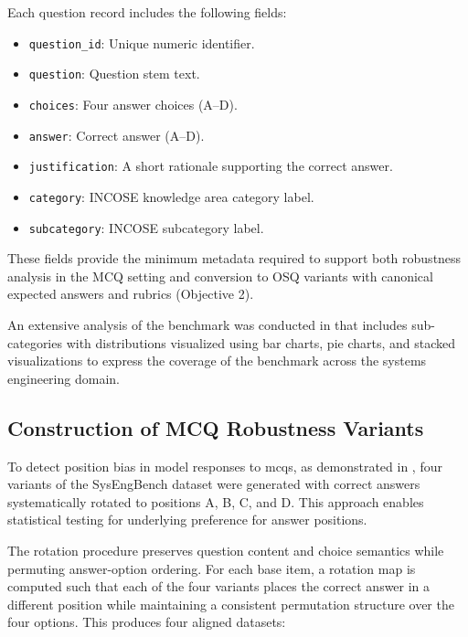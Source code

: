 Each question record includes the following fields:
\begin{itemize}
    \item \texttt{question\_id}: Unique numeric identifier.
    \item \texttt{question}: Question stem text.
    \item \texttt{choices}: Four answer choices (A--D).
    \item \texttt{answer}: Correct answer (A--D).
    \item \texttt{justification}: A short rationale supporting the correct answer.
    \item \texttt{category}: INCOSE knowledge area category label.
    \item \texttt{subcategory}: INCOSE subcategory label.
\end{itemize}

These fields provide the minimum metadata required to support both robustness analysis in the MCQ setting and conversion to OSQ variants with canonical expected answers and rubrics (Objective 2).

An extensive analysis of the benchmark was conducted in \cite{Bell2025SysEngBench} that includes sub-categories with distributions visualized using bar charts, pie charts, and stacked visualizations to express the coverage of the benchmark across the systems engineering domain.


\subsection{Construction of MCQ Robustness Variants}
\label{subsec:ch3_obj1_mcq_variants}

To detect position bias in model responses to \acp{mcq}, as demonstrated in \cite{zhengLargeLanguageModels2024}, four variants of the SysEngBench dataset were generated with correct answers systematically rotated to positions A, B, C, and D. This approach enables statistical testing for underlying preference for answer positions.

The rotation procedure preserves question content and choice semantics while permuting answer-option ordering. For each base item, a rotation map is computed such that each of the four variants places the correct answer in a different position while maintaining a consistent permutation structure over the four options. This produces four aligned datasets:

